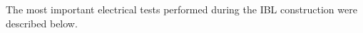 %


The most important electrical tests performed during the IBL construction were described below.

